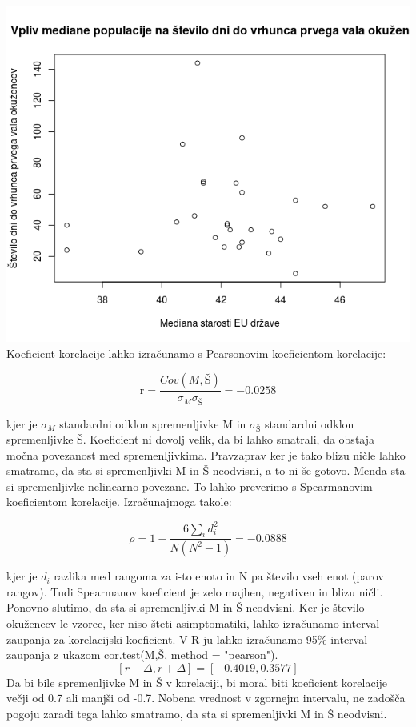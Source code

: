 \documentclass[a4paper,11pt]{article}
\begin{document}
\includegraphics[scale=0.6]{vpliv_med_populacije_na_st_dni_do_peaka_okuezenih}
Koeficient korelacije lahko izračunamo s Pearsonovim koeficientom korelacije:

\begin{center}
\[\text{r} = \frac{Cov(M,Š)}{\sigma_{M} \sigma_{Š}} = -0.0258\]
\end{center} 
kjer je \(\sigma_{M}\) standardni odklon spremenljivke M in \(\sigma_{Š}\) standardni odklon spremenljivke Š. Koeficient ni dovolj velik, da bi lahko smatrali, da obstaja močna povezanost med spremenljivkima. Pravzaprav ker je tako blizu ničle lahko smatramo, da sta si spremenljivki M in Š neodvisni, a to ni še gotovo. Menda sta si spremenljivke nelinearno povezane. To lahko preverimo s Spearmanovim koeficientom korelacije. Izračunajmoga takole: 

\begin{center}
\[\rho = 1 - \frac{6\sum_{i}{}d_i^2}{N(N^2 - 1)} = -0.0888\]
\end{center} 

kjer je \( d_i \) razlika med rangoma za i-to enoto in N pa število vseh enot (parov rangov). Tudi Spearmanov koeficient je zelo majhen, negativen in blizu ničli. Ponovno slutimo, da sta si spremenljivki M in Š neodvisni.
Ker je število okuženecv le vzorec, ker niso šteti asimptomatiki, lahko izračunamo interval zaupanja za korelacijski koeficient. V R-ju lahko izračunamo 95\% interval zaupanja z ukazom cor.test(M,Š, method = "pearson").
\[[r - \Delta, r + \Delta] = [-0.4019, 0.3577]\]
Da bi bile spremenljivke M in Š v korelaciji, bi moral biti koeficient korelacije večji od 0.7 ali manjši od -0.7. Nobena vrednost v zgornejm intervalu, ne zadošča pogoju zaradi tega lahko smatramo, da sta si spremenljivki M in Š neodvisni.
\end{document}
